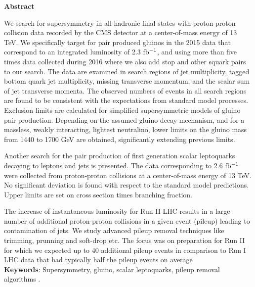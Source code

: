 \begin{center}
{\Large \bf Abstract}
\vskip 0.5cm
\end{center}




\thispagestyle{empty}
\begin{singlespacing}

We search for supersymmetry in all hadronic final states with proton-proton collision data recorded by the CMS detector at a center-of-mass energy of 13 TeV. We specifically target for pair produced gluinos in the 2015 data that correspond to an integrated luminosity of 2.3 $\rm fb^{-1}$, and using more than five times  data collected during 2016 where we also add stop and other squark pairs to our search. The data are examined in search regions of jet multiplicity, tagged bottom quark jet multiplicity, missing transverse momentum, and the scalar sum of jet transverse momenta. The observed numbers of events in all search regions are found to be consistent with the expectations from standard model processes. Exclusion limits are calculated for simplified supersymmetric models of gluino pair production. Depending on the assumed gluino decay mechanism, and for a massless, weakly interacting, lightest neutralino, lower limits on the gluino mass from 1440 to 1700 GeV are obtained, significantly extending previous limits.

Another search for the pair production of first generation scalar leptoquarks decaying to leptons and jets is presented. The data corresponding to 2.6 $\rm fb^{-1}$ were collected from proton-proton collisions at a center-of-mass energy of 13 TeV. No significant deviation is found with respect to the standard model predictions. Upper limits are set on cross section times branching fraction. 

The increase of instantaneous luminosity for Run II LHC results in a large number of additional proton-proton collisions in a given event (pileup) leading to contamination of jets. We study advanced pileup removal techniques like trimming, prunning and soft-drop  etc. The focus was on preparation for Run II for which we expected up to 40 additional pileup events in comparison to Run I LHC data that had typically half the pileup events on average\\
{\bf Keywords}: Supersymmetry, gluino, scalar leptoquarks, pileup removal algorithms .

\end{singlespacing}


\thispagestyle{empty}
\newpage

